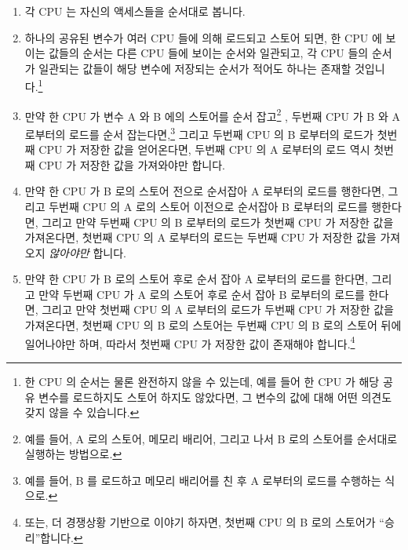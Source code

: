 \begin{enumerate}
\item	각 CPU 는 자신의 액세스들을 순서대로 봅니다.
\item	하나의 공유된 변수가 여러 CPU 들에 의해 로드되고 스토어 되면, 한 CPU 에
	보이는 값들의 순서는 다른 CPU 들에 보이는 순서와 일관되고, 각 CPU 들의
	순서가 일관되는 값들이 해당 변수에 저장되는 순서가 적어도 하나는 존재할
	것입니다.\footnote{
		한 CPU 의 순서는 물론 완전하지 않을 수 있는데, 예를 들어 한 CPU
		가 해당 공유 변수를 로드하지도 스토어 하지도 않았다면, 그
		변수의 값에 대해 어떤 의견도 갖지 않을 수 있습니다.}
\item	만약 한 CPU 가 변수 A 와 B 에의 스토어를 순서 잡고\footnote{
		예를 들어, A 로의 스토어, 메모리 배리어, 그리고 나서 B 로의
		스토어를 순서대로 실행하는 방법으로.}
	, 두번째 CPU 가 B 와 A 로부터의 로드를 순서 잡는다면,\footnote{
		예를 들어, B 를 로드하고 메모리 배리어를 친 후 A 로부터의
		로드를 수행하는 식으로.}
	그리고 두번째 CPU 의 B 로부터의 로드가 첫번째 CPU 가 저장한 값을
	얻어온다면, 두번째 CPU 의 A 로부터의 로드 역시 첫번째 CPU 가 저장한
	값을 가져와야만 합니다.

\item	만약 한 CPU 가 B 로의 스토어 전으로 순서잡아 A 로부터의 로드를
	행한다면, 그리고 두번째 CPU 의 A 로의 스토어 이전으로 순서잡아 B
	로부터의 로드를 행한다면, 그리고 만약 두번째 CPU 의 B 로부터의 로드가
	첫번째 CPU 가 저장한 값을 가져온다면, 첫번째 CPU 의 A 로부터의 로드는
	두번째 CPU 가 저장한 값을 가져오지 \emph{않아야만} 합니다.
\item	만약 한 CPU 가 B 로의 스토어 후로 순서 잡아 A 로부터의 로드를 한다면,
	그리고 만약 두번째 CPU 가 A 로의 스토어 후로 순서 잡아 B 로부터의
	로드를 한다면, 그리고 만약 첫번째 CPU 의 A 로부터의 로드가 두번째 CPU
	가 저장한 값을 가져온다면, 첫번째 CPU 의 B 로의 스토어는 두번째 CPU 의
	B 로의 스토어 뒤에 일어나야만 하며, 따라서 첫번째 CPU 가 저장한 값이
	존재해야 합니다.\footnote{
		또는, 더 경쟁상황 기반으로 이야기 하자면, 첫번째 CPU 의 B 로의
		스토어가 ``승리''합니다.}
\iffalse


\end{enumerate}

